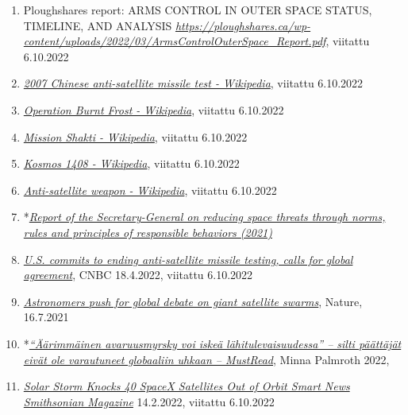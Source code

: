 \documentclass[nobib,finnish,oneside,openany,notoc,a4paper]{tufte-book}
\begin{document}
{\begin{enumerate}
\item
  Ploughshares report: ARMS CONTROL IN OUTER SPACE STATUS, TIMELINE, AND
  ANALYSIS\emph{
  }\href{https://ploughshares.ca/wp-content/uploads/2022/03/ArmsControlOuterSpace_Report.pdf}{\emph{https://ploughshares.ca/wp-content/uploads/2022/03/ArmsControlOuterSpace\_Report.pdf}},
  viitattu 6.10.2022
\item
  \href{https://en.wikipedia.org/wiki/2007_Chinese_anti-satellite_missile_test}{\emph{2007
  Chinese anti-satellite missile test - Wikipedia}}, viitattu 6.10.2022
\item
  \href{https://en.wikipedia.org/wiki/Operation_Burnt_Frost}{\emph{Operation
  Burnt Frost - Wikipedia}}, viitattu 6.10.2022
\item
  \href{https://en.wikipedia.org/wiki/Mission_Shakti}{\emph{Mission
  Shakti - Wikipedia}}, viitattu 6.10.2022
\item
  \href{https://en.wikipedia.org/wiki/Kosmos_1408}{\emph{Kosmos 1408 -
  Wikipedia}}, viitattu 6.10.2022
\item
  \href{https://en.wikipedia.org/wiki/Anti-satellite_weapon}{\emph{Anti-satellite
  weapon - Wikipedia}}, viitattu 6.10.2022
\item
    *\href{https://www.un.org/disarmament/topics/outerspace-sg-report-outer-space-2021/}{\emph{Report
    of the Secretary-General on reducing space threats through norms,
    rules and principles of responsible behaviors (2021)}}
\item
  \href{https://www.cnbc.com/2022/04/18/us-to-end-anti-satellite-asat-testing-calls-for-global-agreement.html}{\emph{U.S.
  commits to ending anti-satellite missile testing, calls for global
  agreement}}, CNBC 18.4.2022, viitattu 6.10.2022
\item
  \href{https://www.nature.com/articles/d41586-021-01954-4}{\emph{Astronomers
  push for global debate on giant satellite swarms}}, Nature, 16.7.2021
\item
    *\href{https://www.mustread.fi/artikkelit/aarimmainen-avaruusmyrsky-voi-iskea-lahitulevaisuudessa-silti-paattajat-eivat-ole-varautuneet-globaaliin-uhkaan/}{\emph{``Äärimmäinen
    avaruusmyrsky voi iskeä lähitulevaisuudessa'' -- silti päättäjät
    eivät ole varautuneet globaaliin uhkaan -- MustRead}}, Minna
    Palmroth 2022,
\item
  \href{https://www.smithsonianmag.com/smart-news/solar-storm-knocks-40-spacex-satellites-out-of-orbit-180979566/}{\emph{Solar
  Storm Knocks 40 SpaceX Satellites Out of Orbit \textbar{} Smart
  News\textbar{} Smithsonian Magazine}} 14.2.2022, viitattu 6.10.2022

\end{enumerate}}
\end{document}
